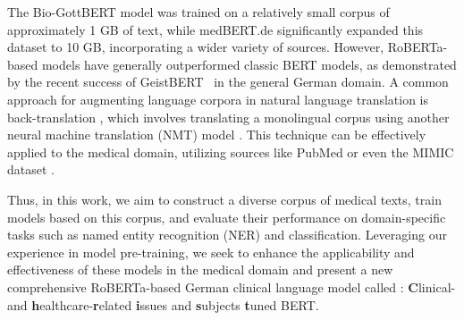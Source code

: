 The Bio-GottBERT model was trained on a relatively small corpus of approximately
1 GB of text, while medBERT.de significantly expanded this dataset to 10 GB,
incorporating a wider variety of sources. However, RoBERTa-based models have
generally outperformed classic BERT models, as demonstrated by the recent
success of GeistBERT~\cite{} in the general German domain. A common approach for
augmenting language corpora in natural language translation is back-translation
\cite{edunov2018understanding}, which involves translating a monolingual corpus
using another neural machine translation (NMT) model \cite{ng2019facebook}. This
technique can be effectively applied to the medical domain, utilizing sources
like PubMed or even the MIMIC dataset \cite{johnson2023mimic}.

Thus, in this work, we aim to construct a diverse corpus of medical texts, train
models based on this corpus, and evaluate their performance on domain-specific
tasks such as named entity recognition (NER) and classification. Leveraging our
experience in model pre-training, we seek to enhance the applicability and
effectiveness of these models in the medical domain and present a new
comprehensive RoBERTa-based German clinical language model called \ChristBERT{}:
\textbf{C}linical- and \textbf{h}ealthcare-\textbf{r}elated \textbf{i}ssues and
\textbf{s}ubjects \textbf{t}uned BERT.
